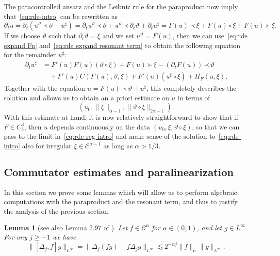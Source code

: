 \documentclass[a4paper,11pt]{article}
\newtheorem{lemma}[theorem]{Lemma}
\theoremstyle{remark}
\newcommand{\CC}{\ensuremath{\mathscr{C}}}
\newcommand{\lpara}{\,\mathord{\prec}\,}
\newcommand{\rpara}{\,\mathord{\succ}\,}
\newcommand{\reso}{\,\mathord{\circ}\,}
\begin{document}
The paracontrolled ansatz and the Leibniz rule for the paraproduct now imply
that~{\eqref{eq:rde-intro}} can be rewritten as
\[
   \partial_{t} u= \partial_{t} ( u^{\vartheta} \lpara \vartheta +u^{\sharp} ) = \partial_{t} u^{\vartheta} \lpara \vartheta +u^{\vartheta} \lpara \partial_{t} \vartheta + \partial_{t} u^{\sharp} =F ( u ) \lpara \xi +F ( u ) \reso   \xi +F ( u ) \rpara \xi.
\]
If we choose $\vartheta$ such that $\partial_{t} \vartheta = \xi$ %
and we set $u^{\vartheta} =F ( u )$, then we can
use~{\eqref{eq:rde expand Fu}} and~{\eqref{eq:rde expand resonant term}} to
obtain the following equation for the remainder $u^{\sharp}$:
\begin{align*}%
  \partial_{t} u^{\sharp} & = F' ( u ) F ( u ) (\vartheta \reso \xi ) +F ( u ) \rpara \xi - ( \partial_{t} F ( u )) \lpara \vartheta \\
  &\quad +F' ( u ) C ( F ( u ) , \vartheta , \xi ) +F' ( u )  ( u^{\sharp} \reso \xi) + \Pi_{F} ( u, \xi ).
\end{align*}
Together with the equation $u=F ( u ) \lpara \vartheta +u^{\sharp}$, this completely describes the solution and allows us to obtain an a priori estimate on $u$ in terms of 
\[
   (u_0, \|\xi\|_{\alpha-1}, \|\vartheta \reso \xi\|_{2\alpha-1}).
\]
With this estimate at hand, it is now relatively straightforward to show that if $F \in C^3_b$, then $u$ depends continuously on the data $(u_0, \xi, \vartheta \reso \xi)$, so that we can pass to the limit in~\eqref{eq:rde-reg-intro} and make sense of the solution to~\eqref{eq:rde-intro} also for irregular $\xi \in \CC^{\alpha-1}$ as long as $\alpha > 1/3$.


\subsection{Commutator estimates and paralinearization}

In this section we prove some lemmas which will allow us to perform algebraic computations with the paraproduct and the resonant term, and thus to justify the analysis of the previous section.

\begin{lemma}[see also Lemma 2.97 of {\cite{Bahouri2011}}]\label{l:bahouri commutator}
  Let $f \in \CC^{\alpha}$ for $\alpha \in ( 0,1 )$, and let $g \in L^{\infty}$. For any $j \geqslant -1$ we have
  \[
     \| [ \Delta_{j} ,f ] g \|_{L^{\infty}} = \| \Delta_{j} ( f g ) -f \Delta_{j} g \|_{L^{\infty}} \lesssim 2^{- \alpha j} \|  f \|_{\alpha} \| g \|_{L^{\infty}} .
  \]
\end{lemma}
\end{document}
